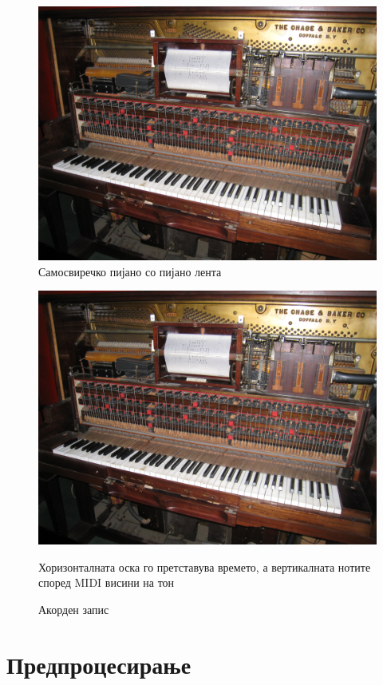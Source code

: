 \begin{figure}[H]
	\centering
\includegraphics[scale=.3]{images/piano.jpeg}
	\caption{Самосвиречко пијано со пијано лента}
	\label{fig:piano_pr}
\end{figure}

\begin{figure}[H]
	\centering
\includegraphics[scale=0.9]{images/piano}
	\caption{Акорден запис}
	Хоризонталната оска го претставува времето, а вертикалната нотите според MIDI висини на тон
	\label{fig:piano_roll}
\end{figure}

\section{Предпроцесирање}

